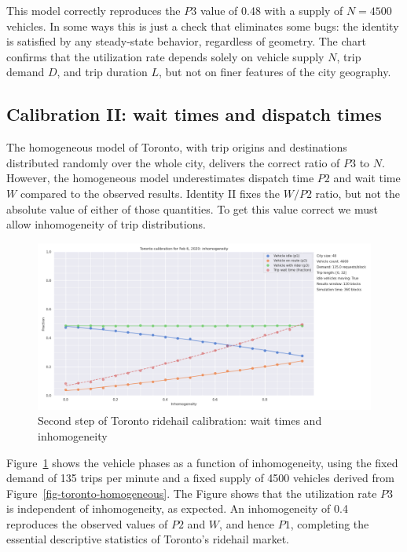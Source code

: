 \documentclass[
  letterpaper,
]{article}
\begin{document}
This model correctly reproduces the \(P3\) value of 0.48 with a supply
of \(N = 4500\) vehicles. In some ways this is just a check that
eliminates some bugs: the identity is satisfied by any steady-state
behavior, regardless of geometry. The chart confirms that the
utilization rate depends solely on vehicle supply \(N\), trip demand
\(D\), and trip duration \(L\), but not on finer features of the city
geography.

\hypertarget{calibration-ii-wait-times-and-dispatch-times}{%
\subsection{Calibration II: wait times and dispatch
times}\label{calibration-ii-wait-times-and-dispatch-times}}

The homogeneous model of Toronto, with trip origins and destinations
distributed randomly over the whole city, delivers the correct ratio of
\(P3\) to \(N\). However, the homogeneous model underestimates dispatch
time \(P2\) and wait time \(W\) compared to the observed results.
Identity II fixes the \(W/P2\) ratio, but not the absolute value of
either of those quantities. To get this value correct we must allow
inhomogeneity of trip distributions.

\begin{figure}

{\centering \includegraphics{toronto_calibration_inhomogeneous.png}

}

\caption{\label{fig-inhomog}Second step of Toronto ridehail calibration:
wait times and inhomogeneity}

\end{figure}

Figure~\ref{fig-inhomog} shows the vehicle phases as a function of
inhomogeneity, using the fixed demand of 135 trips per minute and a
fixed supply of 4500 vehicles derived from
Figure~\ref{fig-toronto-homogeneous}. The Figure shows that the
utilization rate \(P3\) is independent of inhomogeneity, as expected. An
inhomogeneity of 0.4 reproduces the observed values of \(P2\) and \(W\),
and hence \(P1\), completing the essential descriptive statistics of
Toronto's ridehail market.
\end{document}
